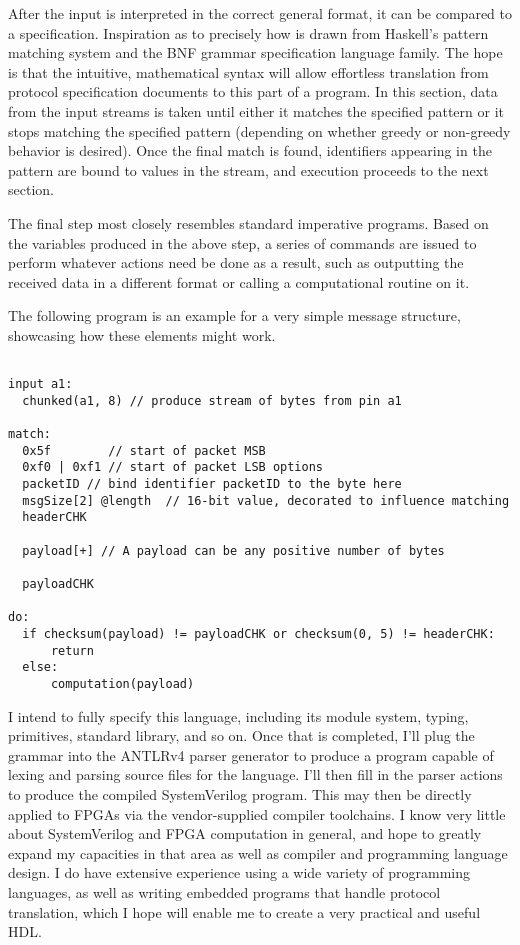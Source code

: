 \documentclass[12pt, arial, letterpaper]{article}
\begin{document}
After the input is interpreted in the correct general format, it can be compared to a specification. Inspiration as to precisely how is drawn from Haskell's pattern matching system \cite{Marlow_haskell2010} and the BNF grammar specification  language family\cite{bnf}. The hope is that the intuitive, mathematical syntax will allow effortless translation from protocol specification documents to this part of a program. In this section, data from the input streams is taken until either it matches the specified pattern or it stops matching the specified pattern (depending on whether greedy or non-greedy behavior is desired). Once the final match is found, identifiers appearing in the pattern are bound to values in the stream, and execution proceeds to the next section.
\newline

The final step most closely resembles standard imperative programs. Based on the variables produced in the above step, a series of commands are issued to perform whatever actions need be done as a result, such as outputting the received data in a different format or calling a computational routine on it.
\newline

The following program is an example for a very simple message structure, showcasing how these elements might work.
\begin{verbatim}

input a1:
  chunked(a1, 8) // produce stream of bytes from pin a1

match:
  0x5f        // start of packet MSB
  0xf0 | 0xf1 // start of packet LSB options
  packetID // bind identifier packetID to the byte here
  msgSize[2] @length  // 16-bit value, decorated to influence matching
  headerCHK

  payload[+] // A payload can be any positive number of bytes 

  payloadCHK

do:
  if checksum(payload) != payloadCHK or checksum(0, 5) != headerCHK:
      return
  else:
      computation(payload)

\end{verbatim}


I intend to fully specify this language, including its module system, typing, primitives, standard library, and so on. Once that is completed, I'll plug the grammar into the ANTLRv4 parser generator \cite{antlr} to produce a program capable of lexing and parsing source files for the language. I'll then fill in the parser actions to produce the compiled SystemVerilog program. This may then be directly applied to FPGAs via the vendor-supplied compiler toolchains.
I know very little about SystemVerilog and FPGA computation in general, and hope to greatly expand my capacities in that area as well as compiler and programming language design. I do have extensive experience using a wide variety of programming languages, as well as writing embedded programs that handle protocol translation, which I hope will enable me to create a very practical and useful HDL.
\newline
\end{document}
